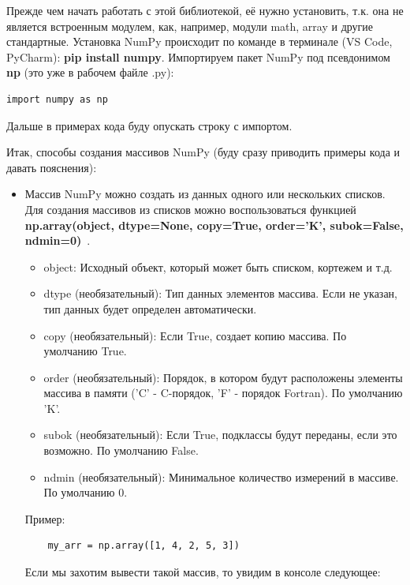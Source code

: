 \documentclass[pract]{SCWorks}
\begin{document}
Прежде чем начать работать с этой библиотекой, её нужно установить, т.к. она не является встроенным 
модулем, как, например, модули math, array и другие стандартные.  
Установка NumPy происходит по команде в терминале (VS Code, PyCharm): \textbf{pip install numpy}. Импортируем пакет 
NumPy под псевдонимом \textbf{np} (это уже в рабочем файле .py): 

\begin{verbatim}
import numpy as np  
\end{verbatim}

Дальше в примерах кода буду опускать строку с импортом.

Итак, способы создания массивов NumPy (буду сразу приводить примеры кода и давать пояснения):

\begin{itemize}
    \item Массив NumPy можно создать из данных одного или нескольких списков. Для создания массивов из 
    списков можно воспользоваться функцией \textbf{np.array(object, dtype=None, copy=True, order='K', subok=False, ndmin=0)}~\cite{numpy-docs}.

    \begin{itemize}
        \item object: Исходный объект, который может быть списком, кортежем и т.д.
        \item dtype (необязательный): Тип данных элементов массива. Если не указан, тип данных будет определен 
        автоматически.
        \item copy (необязательный): Если True, создает копию массива. По умолчанию True.
        \item order (необязательный): Порядок, в котором будут расположены элементы массива в памяти ('C' - C-порядок, 'F' - порядок Fortran). 
        По умолчанию 'K'.
        \item subok (необязательный): Если True, подклассы будут переданы, если это возможно. По умолчанию False.
        \item ndmin (необязательный): Минимальное количество измерений в массиве. По умолчанию 0.
    \end{itemize}

    Пример:

    \begin{verbatim}
    my_arr = np.array([1, 4, 2, 5, 3])    
    \end{verbatim}

    Если мы захотим вывести такой массив, то увидим в консоле следующее: 
    

\end{itemize}
\end{document}
